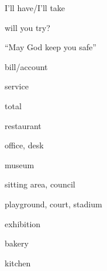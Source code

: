 \documentclass[avery5371,grid,frame]{flashcards}
\begin{document}
\begin{flashcard}{\LARGE I'll have/I'll take}
\LARGE {}
\end{flashcard}
\begin{flashcard}{\LARGE will you try?}
\LARGE {}
\end{flashcard}
\begin{flashcard}{\LARGE ``May God keep you safe''}
\LARGE {}
\end{flashcard}
\begin{flashcard}{\LARGE bill/account}
\LARGE {}
\end{flashcard}
\begin{flashcard}{\LARGE service}
\LARGE {}
\end{flashcard}
\begin{flashcard}{\LARGE total}
\LARGE {}
\end{flashcard}
\begin{flashcard}{\LARGE restaurant}
\LARGE {}
\end{flashcard}
\begin{flashcard}{\LARGE office, desk}
\LARGE {}
\end{flashcard}
\begin{flashcard}{\LARGE museum}
\LARGE {}
\end{flashcard}
\begin{flashcard}{\LARGE sitting area, council}
\LARGE {}
\end{flashcard}
\begin{flashcard}{\LARGE playground, court, stadium}
\LARGE {}
\end{flashcard}
\begin{flashcard}{\LARGE exhibition}
\LARGE {}
\end{flashcard}
\begin{flashcard}{\LARGE bakery}
\LARGE {}
\end{flashcard}
\begin{flashcard}{\LARGE kitchen}
\LARGE {}
\end{flashcard}
\end{document}
